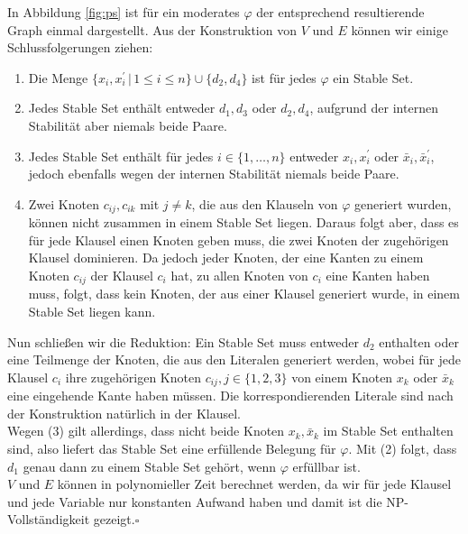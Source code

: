 \documentclass[11pt,a4paper]{article}
\newcommand{\qed}{\hfill\(\square\)}
\begin{document}
In Abbildung \ref{fig:ps} ist für ein moderates \( \varphi \) der entsprechend resultierende Graph einmal dargestellt.
Aus der Konstruktion von \( V \) und \( E \) können wir einige Schlussfolgerungen ziehen:
\begin{enumerate}
	\item Die Menge \( \lbrace x_i, x_i^\prime \,\vert\, 1 \leq i \leq n \rbrace \cup \lbrace d_2, d_4 \rbrace \) ist für jedes \( \varphi \) ein Stable Set.
	\item Jedes Stable Set enthält entweder \( d_1, d_3 \) oder \( d_2, d_4 \), aufgrund der internen Stabilität aber niemals beide Paare.
	\item Jedes Stable Set enthält für jedes \( i \in \lbrace 1, \ldots, n \rbrace \) entweder \( x_i, x_i^\prime \) oder \( \bar{x}_i, \bar{x}_i^\prime \), jedoch ebenfalls wegen der internen Stabilität niemals beide Paare.
	\item Zwei Knoten \( c_{ij}, c_{ik} \) mit \( j \neq k \), die aus den Klauseln von \( \varphi \) generiert wurden, können nicht zusammen in einem Stable Set liegen. Daraus folgt aber, dass es für jede Klausel einen Knoten geben muss, die zwei Knoten der zugehörigen Klausel dominieren. Da jedoch jeder Knoten, der eine Kanten zu einem Knoten \( c_{ij} \) der Klausel \( c_i \) hat, zu allen Knoten von \( c_i \) eine Kanten haben muss, folgt, dass kein Knoten, der aus einer Klausel generiert wurde, in einem Stable Set liegen kann.
\end{enumerate}
Nun schließen wir die Reduktion: Ein Stable Set muss entweder \( d_2 \) enthalten oder eine Teilmenge der Knoten, die aus den Literalen generiert werden, wobei für jede Klausel \( c_i \) ihre zugehörigen Knoten \( c_{ij}, j \in \lbrace 1, 2, 3 \rbrace \) von einem Knoten \( x_k \) oder \( \bar{x}_k \) eine eingehende Kante haben müssen. Die korrespondierenden Literale sind nach der Konstruktion natürlich in der Klausel.\\
Wegen (3) gilt allerdings, dass nicht beide Knoten \( x_k, \bar{x}_k \) im Stable Set enthalten sind, also liefert das Stable Set eine erfüllende Belegung für \( \varphi \).  Mit (2) folgt, dass \( d_1 \) genau dann zu einem Stable Set gehört, wenn \( \varphi \) erfüllbar ist.\\
\( V \) und \( E \) können in polynomieller Zeit berechnet werden, da wir für jede Klausel und jede Variable nur konstanten Aufwand haben und damit ist die \textsf{NP}-Vollständigkeit gezeigt.\qed
\end{document}
